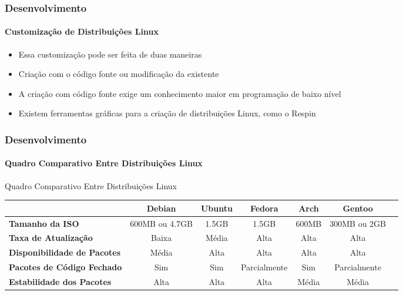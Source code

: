 \documentclass[aspectratio=43]{beamer}
\begin{document}
\begin{frame}
    \frametitle{Desenvolvimento}
    \framesubtitle{Customização de Distribuições Linux}

    \begin{itemize}
        \item Essa customização pode ser feita de duas maneiras

        \item Criação com o código fonte ou modificação da existente

        \item A criação com código fonte exige um conhecimento maior
            em programação de baixo nível

        \item Existem ferramentas gráficas para a criação de
            distribuições Linux, como o Respin \cite{Respin2018}

    \end{itemize}
\end{frame}

\begin{frame}
    \frametitle{Desenvolvimento}
    \framesubtitle{Quadro Comparativo Entre Distribuições Linux}

        \small
        \centering
        \caption{\label{table:quadro-comparativo}Quadro Comparativo Entre
        Distribuições Linux}
            \begin{tabularx}{1\textwidth}{>{\raggedright}p{2cm}cccccc}
                \toprule
                \multicolumn{1}{l}{\bfseries Distribuição} &
                \multicolumn{1}{c}{Debian} &
                \multicolumn{1}{c}{Ubuntu} &
                \multicolumn{1}{c}{Fedora} &
                \multicolumn{1}{c}{Arch} &
                \multicolumn{1}{c}{Gentoo} \\
                \midrule

                \textbf{Tamanho da ISO}              & 600MB ou 4.7GB & 1.5GB & 1.5GB & 600MB & 300MB ou 2GB \\
                \midrule
                \textbf{Taxa de Atualização}         & Baixa & Média & Alta & Alta & Alta \\
                \midrule
                \textbf{Disponibilidade de Pacotes}  & Média & Alta & Alta & Alta & Alta \\
                \midrule
                \textbf{Pacotes de Código Fechado}   & Sim & Sim & Parcialmente & Sim & Parcialmente \\
                \midrule
                \textbf{Estabilidade dos Pacotes}   & Alta & Alta & Alta & Média & Média \\

                \toprule
            \end{tabularx}
\end{frame}
\end{document}

